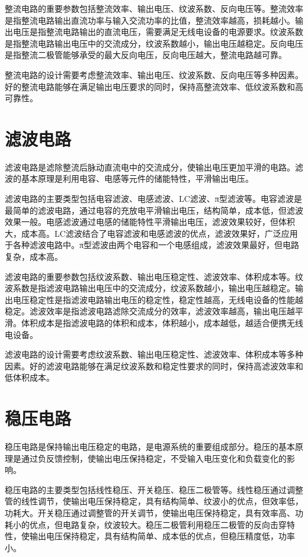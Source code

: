 \documentclass[12pt,UTF8]{ctexbook}
\begin{document}
整流电路的重要参数包括整流效率、输出电压、纹波系数、反向电压等。整流效率是指整流电路输出直流功率与输入交流功率的比值，整流效率越高，损耗越小。输出电压是指整流电路输出的直流电压，需要满足无线电设备的电源要求。纹波系数是指整流电路输出电压中的交流成分，纹波系数越小，输出电压越稳定。反向电压是指整流二极管能够承受的最大反向电压，反向电压越大，整流电路越可靠。

整流电路的设计需要考虑整流效率、输出电压、纹波系数、反向电压等多种因素。好的整流电路能够在满足输出电压要求的同时，保持高整流效率、低纹波系数和高可靠性。

\section{滤波电路}

滤波电路是滤除整流后脉动直流电中的交流成分，使输出电压更加平滑的电路。滤波的基本原理是利用电容、电感等元件的储能特性，平滑输出电压。

滤波电路的主要类型包括电容滤波、电感滤波、LC滤波、π型滤波等。电容滤波是最简单的滤波电路，通过电容的充放电平滑输出电压，结构简单，成本低，但滤波效果一般。电感滤波通过电感的储能特性平滑输出电压，滤波效果较好，但体积大，成本高。LC滤波结合了电容滤波和电感滤波的优点，滤波效果好，广泛应用于各种滤波电路中。π型滤波由两个电容和一个电感组成，滤波效果最好，但电路复杂，成本高。

滤波电路的重要参数包括纹波系数、输出电压稳定性、滤波效率、体积成本等。纹波系数是指滤波电路输出电压中的交流成分，纹波系数越小，输出电压越稳定。输出电压稳定性是指滤波电路输出电压的稳定性，稳定性越高，无线电设备的性能越稳定。滤波效率是指滤波电路滤除交流成分的效率，滤波效率越高，输出电压越平滑。体积成本是指滤波电路的体积和成本，体积越小，成本越低，越适合便携无线电设备。

滤波电路的设计需要考虑纹波系数、输出电压稳定性、滤波效率、体积成本等多种因素。好的滤波电路能够在满足纹波系数和稳定性要求的同时，保持高滤波效率和低体积成本。

\section{稳压电路}

稳压电路是保持输出电压稳定的电路，是电源系统的重要组成部分。稳压的基本原理是通过负反馈控制，使输出电压保持稳定，不受输入电压变化和负载变化的影响。

稳压电路的主要类型包括线性稳压、开关稳压、稳压二极管等。线性稳压通过调整管的线性调节，使输出电压保持稳定，具有结构简单、纹波小的优点，但效率低，功耗大。开关稳压通过调整管的开关调节，使输出电压保持稳定，具有效率高、功耗小的优点，但电路复杂，纹波较大。稳压二极管利用稳压二极管的反向击穿特性，使输出电压保持稳定，具有结构简单、成本低的优点，但稳压精度低，功率小。
\end{document}
